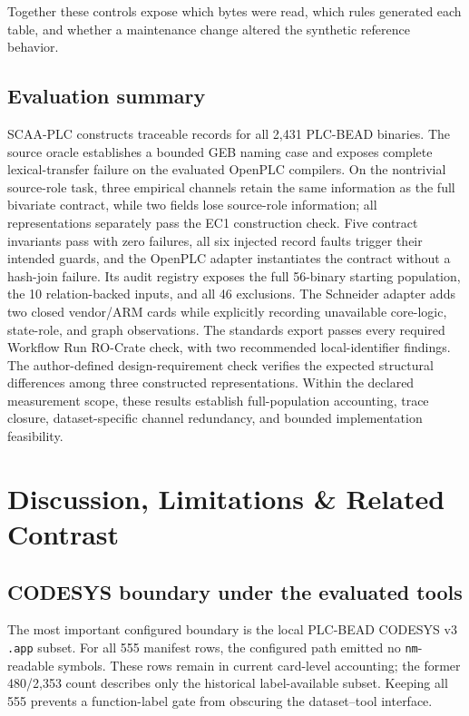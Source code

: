 \documentclass[a4paper,fleqn]{cas-dc}
\begin{document}
Together these controls expose which bytes were read, which rules generated each table, and whether a maintenance change altered the synthetic reference behavior.

\subsection{Evaluation summary}

SCAA-PLC constructs traceable records for all 2{,}431 PLC-BEAD binaries. The source oracle establishes a bounded GEB naming case and exposes complete lexical-transfer failure on the evaluated OpenPLC compilers. On the nontrivial source-role task, three empirical channels retain the same information as the full bivariate contract, while two fields lose source-role information; all representations separately pass the EC1 construction check. Five contract invariants pass with zero failures, all six injected record faults trigger their intended guards, and the OpenPLC adapter instantiates the contract without a hash-join failure. Its audit registry exposes the full 56-binary starting population, the 10 relation-backed inputs, and all 46 exclusions. The Schneider adapter adds two closed vendor/ARM cards while explicitly recording unavailable core-logic, state-role, and graph observations. The standards export passes every required Workflow Run RO-Crate check, with two recommended local-identifier findings. The author-defined design-requirement check verifies the expected structural differences among three constructed representations. Within the declared measurement scope, these results establish full-population accounting, trace closure, dataset-specific channel redundancy, and bounded implementation feasibility.



\section{Discussion, Limitations \& Related Contrast}

\subsection{CODESYS boundary under the evaluated tools}

The most important configured boundary is the local PLC-BEAD CODESYS v3 \texttt{.app} subset. For all 555 manifest rows, the configured path emitted no \texttt{nm}-readable symbols. These rows remain in current card-level accounting; the former 480/2{,}353 count describes only the historical label-available subset. Keeping all 555 prevents a function-label gate from obscuring the dataset--tool interface.
\end{document}
